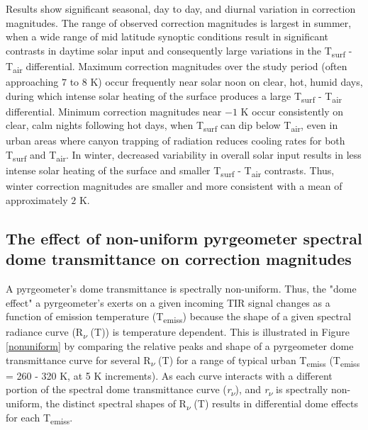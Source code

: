 \begin{bibunit}
Results show significant seasonal, day to day, and diurnal variation in correction magnitudes. The range of observed correction magnitudes is largest in summer, when a wide range of mid latitude synoptic conditions result in significant contrasts in daytime solar input and consequently large variations in the T\textsubscript{surf} - T\textsubscript{air} differential. Maximum correction magnitudes over the study period (often approaching $7$ to $8$ \si{\kelvin}) occur frequently near solar noon on clear, hot, humid days, during which intense solar heating of the surface produces a large T\textsubscript{surf} - T\textsubscript{air} differential. Minimum correction magnitudes near $-1$ \si{\kelvin} occur consistently on clear, calm nights following hot days, when T\textsubscript{surf} can dip below T\textsubscript{air}, even in urban areas where canyon trapping of radiation reduces cooling rates for both T\textsubscript{surf} and T\textsubscript{air}. In winter, decreased variability in overall solar input results in less intense solar heating of the surface and smaller T\textsubscript{surf} - T\textsubscript{air} contrasts. Thus, winter correction magnitudes are smaller and more consistent with a mean of approximately $2$ \si{\kelvin}.

\subsection{The effect of non-uniform pyrgeometer spectral dome transmittance on correction magnitudes}\label{Persistence in correction magnitudes}

A pyrgeometer's dome transmittance is spectrally non-uniform. Thus, the "dome effect" a pyrgeometer's exerts on a given incoming TIR signal changes as a function of emission temperature (T\textsubscript{emiss}) because the shape of a given spectral radiance curve (R\textsubscript{$\nu$} (T)) is temperature dependent. This is illustrated in Figure \ref{nonuniform} by comparing the relative peaks and shape of a pyrgeometer dome transmittance curve for several R\textsubscript{$\nu$} (T) for a range of typical urban T\textsubscript{emiss} (T\textsubscript{emiss} = 260 - 320 \si{\kelvin}, at 5 \si{\kelvin} increments). As each curve interacts with a different portion of the spectral dome transmittance curve (\textit{r\textsubscript{$\nu$}}), and \textit{r\textsubscript{$\nu$}} is spectrally non-uniform, the distinct spectral shapes of R\textsubscript{$\nu$} (T) results in differential dome effects for each T\textsubscript{emiss}.


\end{bibunit}
